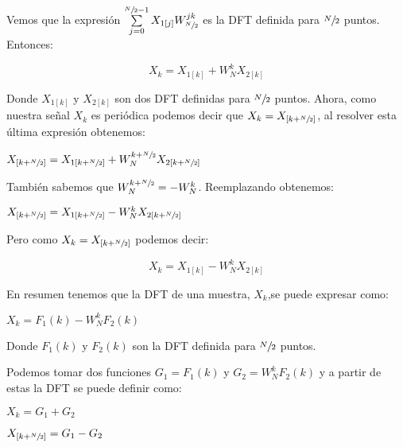 \documentclass[a4paper]{article}
\begin{document}
Vemos que la expresión  $\sum \limits_{j=0}^{\sfrac{N}{2} - 1} X_{1[j]} W_{\sfrac{N}{2}}^{jk}$ es la DFT definida para $\sfrac{N}{2}$ puntos. Entonces:

\begin{equation}
X_{k} = X_{1[k]} + W_{N}^{k} X_{2[k]}
\end{equation}

Donde $X_{1[k]}$ y $X_{2[k]}$ son dos DFT definidas para $\sfrac{N}{2}$ puntos. Ahora, como nuestra señal $X_{k}$ es periódica podemos decir que $X_{k} = X_{[k + \sfrac{N}{2}]}$, al resolver esta última expresión obtenemos:

\begin{center}
$X_{[k + \sfrac{N}{2}]} = X_{1[k + \sfrac{N}{2}]} + W_{N}^{k + \sfrac{N}{2}} X_{2[k + \sfrac{N}{2}]}$
\end{center}

También sabemos que $W_{N}^{k + \sfrac{N}{2}} = -W_{N}^{k}$. Reemplazando obtenemos:

\begin{center}
$X_{[k + \sfrac{N}{2}]} = X_{1[k + \sfrac{N}{2}]} -W_{N}^{k} X_{2[k + \sfrac{N}{2}]}$
\end{center}

Pero como $X_{k} = X_{[k + \sfrac{N}{2}]}$ podemos decir:

\begin{equation}
X_{k} = X_{1[k]} - W_{N}^{k} X_{2[k]}
\end{equation}

En resumen tenemos que la DFT de una muestra, $X_{k}$,se puede expresar como:

\begin{center}
$X_{k} = F_{1}(k) - W_{N}^{k} F_{2}(k)$
\end{center}

\begin{center}
Donde $F_{1}(k)$ y  $F_{2}(k)$ son la DFT definida para $\sfrac{N}{2}$ puntos.
\end{center}

Podemos tomar dos funciones $G_{1} = F_{1}(k)$ y $G_{2} = W_{N}^{k} F_{2}(k)$ y a partir de estas la DFT se puede definir como:

\begin{center}
$X_{k} = G_{1} + G_{2}$
\end{center}

\begin{center}
$X_{[k + \sfrac{N}{2}]} = G_{1} - G_{2}$
\end{center}
\end{document}
